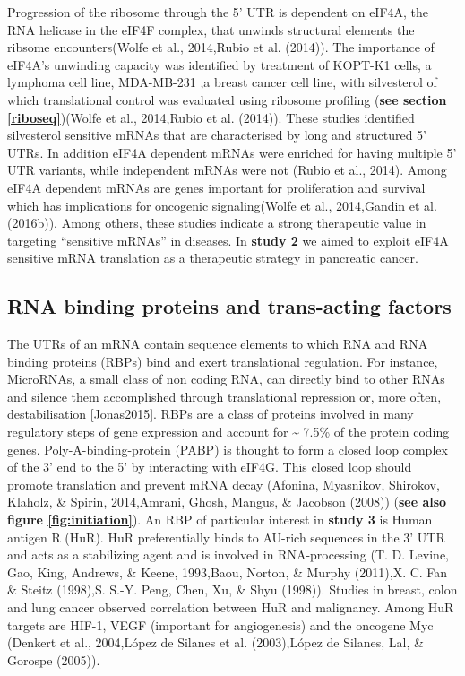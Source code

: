 \documentclass[12pt,openany]{book}
\begin{document}
Progression of the ribosome through the 5' UTR is dependent on eIF4A,
the RNA helicase in the eIF4F complex, that unwinds structural elements
the ribsome encounters(Wolfe et al., 2014,Rubio et al. (2014)). The
importance of eIF4A's unwinding capacity was identified by treatment of
KOPT-K1 cells, a lymphoma cell line, MDA-MB-231 ,a breast cancer cell
line, with silvesterol of which translational control was evaluated
using ribosome profiling (\textbf{see section \ref{riboseq}})(Wolfe et
al., 2014,Rubio et al. (2014)). These studies identified silvesterol
sensitive mRNAs that are characterised by long and structured 5' UTRs.
In addition eIF4A dependent mRNAs were enriched for having multiple 5'
UTR variants, while independent mRNAs were not (Rubio et al., 2014).
Among eIF4A dependent mRNAs are genes important for proliferation and
survival which has implications for oncogenic signaling(Wolfe et al.,
2014,Gandin et al. (2016b)). Among others, these studies indicate a
strong therapeutic value in targeting ``sensitive mRNAs'' in diseases.
In \textbf{study 2} we aimed to exploit eIF4A sensitive mRNA translation
as a therapeutic strategy in pancreatic cancer.

\subsection{RNA binding proteins and trans-acting factors}

The UTRs of an mRNA contain sequence elements to which RNA and RNA
binding proteins (RBPs) bind and exert translational regulation. For
instance, MicroRNAs, a small class of non coding RNA, can directly bind
to other RNAs and silence them accomplished through translational
repression or, more often, destabilisation {[}Jonas2015{]}. RBPs are a
class of proteins involved in many regulatory steps of gene expression
and account for \textasciitilde{} 7.5\% of the protein coding genes.
Poly-A-binding-protein (PABP) is thought to form a closed loop complex
of the 3' end to the 5' by interacting with eIF4G. This closed loop
should promote translation and prevent mRNA decay (Afonina, Myasnikov,
Shirokov, Klaholz, \& Spirin, 2014,Amrani, Ghosh, Mangus, \& Jacobson
(2008)) (\textbf{see also figure \ref{fig:initiation}}). An RBP of
particular interest in \textbf{study 3} is Human antigen R (HuR). HuR
preferentially binds to AU-rich sequences in the 3' UTR and acts as a
stabilizing agent and is involved in RNA-processing (T. D. Levine, Gao,
King, Andrews, \& Keene, 1993,Baou, Norton, \& Murphy (2011),X. C. Fan
\& Steitz (1998),S. S.-Y. Peng, Chen, Xu, \& Shyu (1998)). Studies in
breast, colon and lung cancer observed correlation between HuR and
malignancy. Among HuR targets are HIF-1, VEGF (important for
angiogenesis) and the oncogene Myc (Denkert et al., 2004,López de
Silanes et al. (2003),López de Silanes, Lal, \& Gorospe (2005)).
\end{document}
